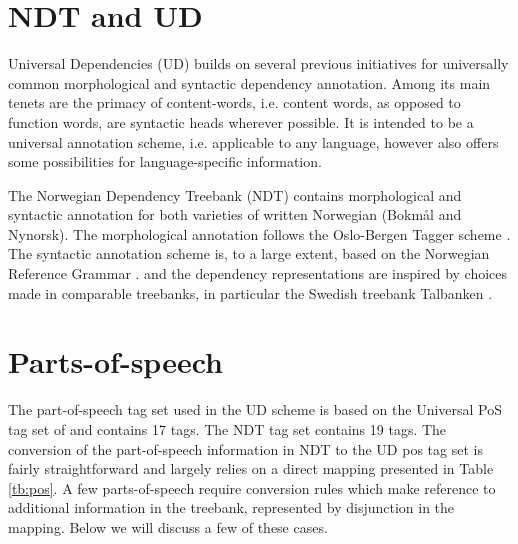\documentclass[11pt,a4paper]{article}
\begin{document}
\section{NDT and UD}
Universal Dependencies (UD) builds on several previous initiatives for universally common
morphological \cite{Zem:08,Pet:Das:McD:12} and syntactic dependency \cite{McD:Niv:Qui:13,Ros:Mas:Mar:14}
annotation. Among its main tenets are the primacy of content-words,
i.e. content words, as opposed to function words, are syntactic heads
wherever possible. It is intended to be a universal annotation scheme,
i.e. applicable to any language, however also offers some
possibilities for language-specific information.

The Norwegian Dependency Treebank (NDT) \cite{Sol:Skj:Ovr:14} contains
morphological and syntactic annotation for both varieties of written
Norwegian (Bokm{\aa}l and Nynorsk). The morphological annotation
follows the Oslo-Bergen Tagger scheme \cite{Hag:Joh:Nok:00}.  The
syntactic annotation scheme is, to a large extent, based on the
Norwegian Reference Grammar \cite{Faa:Lie:Van:97}.  and the dependency
representations are inspired by choices made in comparable treebanks,
in particular the Swedish treebank Talbanken
\cite{Niv:Nil:Hal:2006}.


\section{Parts-of-speech}
The part-of-speech tag set used in the UD scheme is based on the
Universal PoS tag set of  and contains 17 tags. The NDT tag set
contains 19 tags.  The conversion of the part-of-speech information in
NDT to the UD pos tag set is fairly straightforward and largely relies
on a direct mapping presented in Table \ref{tb:pos}.  A few
parts-of-speech require conversion rules which make reference to
additional information in the treebank, represented by disjunction
in the mapping. Below we will discuss a few of these cases.
\end{document}
